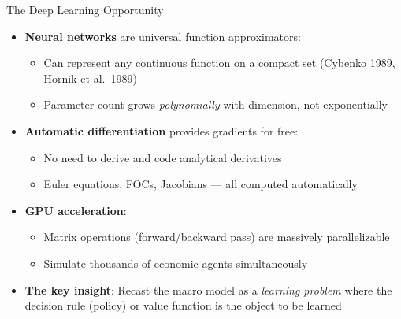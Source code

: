\documentclass[10pt,english,aspectratio=169]{beamer}
\begin{document}
\begin{frame}{The Deep Learning Opportunity}
\begin{itemize}
  \item \textbf{Neural networks} are universal function approximators:
    \begin{itemize}
      \item Can represent any continuous function on a compact set (Cybenko 1989, Hornik et al.\ 1989)
      \item Parameter count grows \emph{polynomially} with dimension, not exponentially
    \end{itemize}
  \medskip
  \item \textbf{Automatic differentiation} provides gradients for free:
    \begin{itemize}
      \item No need to derive and code analytical derivatives
      \item Euler equations, FOCs, Jacobians --- all computed automatically
    \end{itemize}
  \medskip
  \item \textbf{GPU acceleration}:
    \begin{itemize}
      \item Matrix operations (forward/backward pass) are massively parallelizable
      \item Simulate thousands of economic agents simultaneously
    \end{itemize}
  \medskip
  \item \textbf{The key insight}: Recast the macro model as a \emph{learning problem} where the decision rule (policy) or value function is the object to be learned
\end{itemize}
\end{frame}
\end{document}
